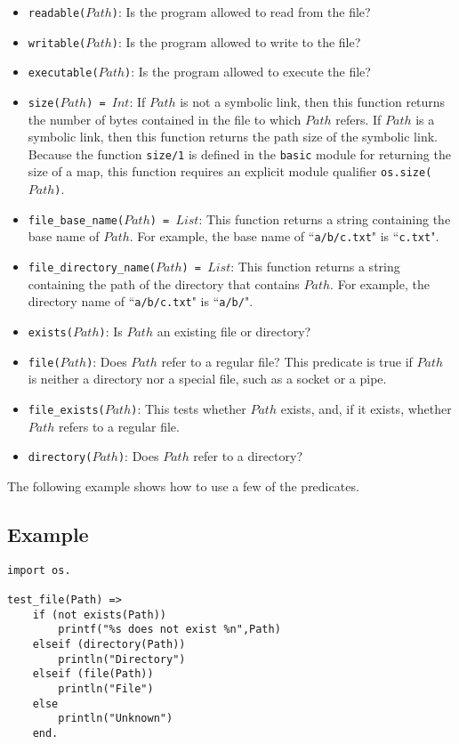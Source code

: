 \begin{itemize}
{}
\item \texttt{readable($Path$)}: Is the program allowed to read from the file?
\item \texttt{writable($Path$)}: Is the program allowed to write to the file?
\item \texttt{executable($Path$)}: Is the program allowed to execute the file?
\item \texttt{size($Path$) = $Int$}: If $Path$ is not a symbolic link, then this function returns the number of bytes contained in the file to which $Path$ refers.  If $Path$ is a symbolic link, then this function returns the path size of the symbolic link. Because the function {\tt size/1} is defined in the {\tt basic} module for returning the size of a map, this function requires an explicit module qualifier {\tt os.size($Path$)}.

\item \texttt{file\_base\_name($Path$) = $List$}: This function returns a string containing the base name of $Path$.  For example, the base name of ``\texttt{a/b/c.txt}" is ``\texttt{c.txt}".
\item \texttt{file\_directory\_name($Path$) = $List$}: This function returns a string containing the path of the directory that contains $Path$.  For example, the directory name of ``\texttt{a/b/c.txt}" is ``\texttt{a/b/}".
\item \texttt{exists($Path$)}: Is $Path$ an existing file or directory?
\item \texttt{file($Path$)}: Does $Path$ refer to a regular file?  This predicate is true if $Path$ is neither a directory nor a special file, such as a socket or a pipe.
\item \texttt{file\_exists($Path$)}:  This tests whether $Path$ exists, and, if it exists, whether $Path$ refers to a regular file.
\item \texttt{directory($Path$)}: Does $Path$ refer to a directory?
\end{itemize}

The following example shows how to use a few of the predicates.

\subsection*{Example}
\begin{verbatim}
import os.

test_file(Path) =>
    if (not exists(Path))
        printf("%s does not exist %n",Path)
    elseif (directory(Path))
        println("Directory")
    elseif (file(Path))
        println("File")
    else
        println("Unknown")
    end.
\end{verbatim}

